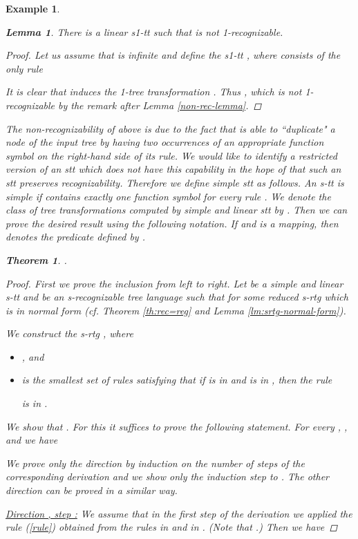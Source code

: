 \documentclass[10pt]{scrartcl}
\newtheorem{lm}[df]{Lemma}
\newtheorem{ex}[df]{Example}
\newtheorem{theo}[df]{Theorem}
\begin{document}
\begin{ex}
\begin{lm} \label{range-lin-lemma}\rm There is a linear s1-tt  such that  is not 1-recognizable.
\end{lm}
\begin{proof} Let us assume that  is infinite and define the s1-tt , where  consists of the only rule

It is clear that  induces the 1-tree transformation . Thus , which is not 1-recognizable
by the remark after Lemma \ref{non-rec-lemma}.
\end{proof}

The non-recognizability of  above is due to the fact that
 is able to ``duplicate" a node of the input tree by having two
occurrences of an appropriate function symbol on the right-hand side
of its rule. We would like to identify a restricted version of an stt
which does not have this capability in the hope of that such an stt
preserves recognizability. Therefore we define simple stt as
follows. An s-tt  is {\em simple} if
 contains exactly one function symbol for every rule . We denote the class of tree transformations computed by simple
and linear stt by . Then we can prove the desired result using
the following notation. If  and  is a mapping, then  denotes the
predicate defined by .



\begin{theo} \label{slin-theo}.
\end{theo}
\begin{proof} First we prove the inclusion from left to right. Let  be a simple and linear s-tt and 
 be an s-recognizable tree language such that  for some reduced s-rtg  which is
in normal form (cf. Theorem \ref{th:rec=reg} and Lemma \ref{lm:srtg-normal-form}).

We construct the s-rtg , where
\begin{itemize}
\item , and
\item  is the smallest set of rules satisfying that if  is in  and  is in , then 
the rule 

 is in .
\end{itemize} 
We show that . For this it suffices
to prove the following statement. For every , , and  we have

We prove only the direction  by induction on the number  of steps of the corresponding derivation and we show only the induction step  to . The other direction can be proved in a similar way.

\underline{Direction , step :} We assume that in the first step of the derivation we applied the rule (\ref{rule}) obtained from the rules
 in  and   in . (Note that .) Then we have


\end{proof}
\end{ex}
\end{document}
